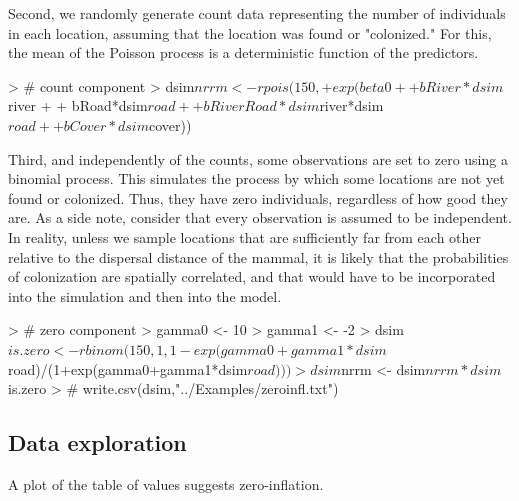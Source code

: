 \documentclass{article}
\begin{document}
Second, we randomly generate count data representing the number of individuals in each location, assuming that the location was found or "colonized." For this, the mean of the Poisson process is a deterministic function of the predictors.

\begin{Schunk}
\begin{Sinput}
> # count component
> dsim$nrrm <- rpois(150,
+                  exp(beta0 +
+                      bRiver*dsim$river +
+                      bRoad*dsim$road +
+                      bRiverRoad*dsim$river*dsim$road +
+                      bCover*dsim$cover))
\end{Sinput}
\end{Schunk}

Third, and independently of the counts, some observations are set to zero using a binomial process. This simulates the process by which some locations are not yet found or colonized. Thus, they have zero individuals, regardless of how good they are. As a side note, consider that every observation is assumed to be independent. In reality, unless we sample locations that are sufficiently far from each other relative to the dispersal distance of the mammal, it is likely that the probabilities of colonization are spatially correlated, and that would have to be incorporated into the simulation and then into the model.

\begin{Schunk}
\begin{Sinput}
> # zero component
> gamma0 <- 10
> gamma1 <- -2
> dsim$is.zero <- rbinom(150,1,1-exp(gamma0+gamma1*dsim$road)/(1+exp(gamma0+gamma1*dsim$road)))
> dsim$nrrm <- dsim$nrrm*dsim$is.zero
> # write.csv(dsim,"../Examples/zeroinfl.txt")
\end{Sinput}
\end{Schunk}

\subsection{Data exploration}

A plot of the table of values suggests zero-inflation.
\end{document}

